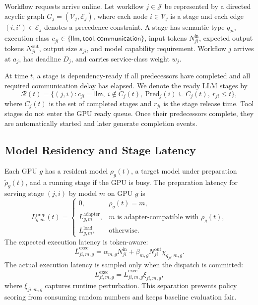 \documentclass[10pt,conference]{IEEEtran}
\newcommand{\calJ}{\mathcal{J}}
\newcommand{\calR}{\mathcal{R}}
\newcommand{\calV}{\mathcal{V}}
\newcommand{\calE}{\mathcal{E}}
\begin{document}
Workflow requests arrive online. Let workflow \(j\in\calJ\) be represented by a directed acyclic graph \(G_j=(\calV_j,\calE_j)\), where each node \(i\in\calV_j\) is a stage and each edge \((i,i')\in\calE_j\) denotes a precedence constraint. A stage has semantic type \(q_{ji}\), execution class \(c_{ji}\in\{\textsf{llm},\textsf{tool},\textsf{communication}\}\), input tokens \(N^{\mathrm{in}}_{ji}\), expected output tokens \(N^{\mathrm{out}}_{ji}\), output size \(s_{ji}\), and model capability requirement. Workflow \(j\) arrives at \(a_j\), has deadline \(D_j\), and carries service-class weight \(w_j\).

At time \(t\), a stage is dependency-ready if all predecessors have completed and all required communication delay has elapsed. We denote the ready LLM stages by
\begin{equation}
\calR(t)=\{(j,i): c_{ji}=\textsf{llm},~i\notin C_j(t),~\mathrm{Pred}_j(i)\subseteq C_j(t),~r_{ji}\le t\},
\end{equation}
where \(C_j(t)\) is the set of completed stages and \(r_{ji}\) is the stage release time. Tool stages do not enter the GPU ready queue. Once their predecessors complete, they are automatically started and later generate completion events.

\subsection{Model Residency and Stage Latency}

Each GPU \(g\) has a resident model \(\rho_g(t)\), a target model under preparation \(\tilde{\rho}_g(t)\), and a running stage if the GPU is busy. The preparation latency for serving stage \((j,i)\) by model \(m\) on GPU \(g\) is
\begin{equation}
L^{\mathrm{prep}}_{g,m}(t)=
\begin{cases}
0, & \rho_g(t)=m,\\
L^{\mathrm{adapter}}_{g,m}, & m \text{ is adapter-compatible with } \rho_g(t),\\
L^{\mathrm{load}}_{g,m}, & \text{otherwise}.
\end{cases}
\end{equation}
The expected execution latency is token-aware:
\begin{equation}
\bar L^{\mathrm{exec}}_{ji,m,g} =
\alpha_{m,g}N^{\mathrm{in}}_{ji}+\beta_{m,g}N^{\mathrm{out}}_{ji}
\chi_{q_{ji},m,g}.
\end{equation}
The actual execution latency is sampled only when the dispatch is committed:
\begin{equation}
L^{\mathrm{exec}}_{ji,m,g}=\bar L^{\mathrm{exec}}_{ji,m,g}\xi_{ji,m,g},
\end{equation}
where \(\xi_{ji,m,g}\) captures runtime perturbation. This separation prevents policy scoring from consuming random numbers and keeps baseline evaluation fair.
\end{document}
